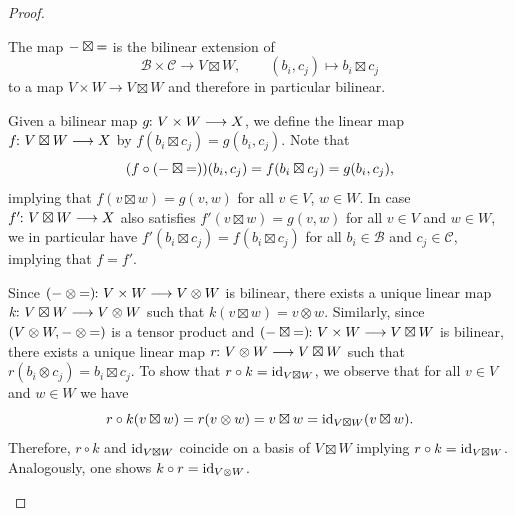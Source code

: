 \documentclass[a4paper, oneside, 12pt]{amsart}
\begin{document}
\begin{proof}
  \begin{thmlist}
    \item The map \( {-} \boxtimes {=} \) is the bilinear extension of
    \begin{equation*}
      \mathcal{B}\times \mathcal{C} \to V\boxtimes W, \qquad (b_{i}, c_{j})\mapsto b_{i}\boxtimes c_{j}
    \end{equation*}
    to a map \(V \times W \to V \boxtimes W\) and therefore in particular bilinear.
    \item Given a bilinear map \( g \from V \times W \to X \), we define the linear map \( f \from V \boxtimes W \to X \) by \( f(b_i \boxtimes c_j) = g(b_i, c_j) \).
    Note that
    \begin{equation*}
      (f\circ( {-} \boxtimes {=})) (b_{i}, c_{j}) =  f(b_{i} \boxtimes c_{j}) = g(b_{i}, c_{j}),
    \end{equation*}
    implying that \(f(v\boxtimes w) = g(v,w)\) for all \(v\in V\), \(w\in W\).
    In case \(f' \from V\boxtimes W \to X \) also satisfies \(f'(v \boxtimes w) = g(v,w)\) for all \(v\in V\) and \(w\in W\), we in particular have \(f'(b_{i}\boxtimes c_{j}) = f(b_{i} \boxtimes c_{j})\) for all \(b_{i}\in \mathcal{B}\) and \(c_{j}\in \mathcal{C}\), implying that \(f = f'\).

    \item Since \( (\blank \otimes \bblank) \from V \times W \to V \otimes W \) is bilinear, there exists a unique linear map \( k \from V \boxtimes W \to V \otimes W \) such that \( k(v \boxtimes w) = v \otimes w\).
    Similarly, since \(( V \otimes W, {-} \otimes {=}) \) is a tensor product and \( (\blank \boxtimes \bblank) \from V\times W \to V\boxtimes W\) is bilinear, there exists a unique linear map \( r \from V \otimes W \to V \boxtimes W \) such that \( r(b_i \otimes c_j) = b_i \boxtimes c_j \).
    To show that \(r\circ k = \mathrm{id}_{V\boxtimes W}\), we observe that for all \(v\in V\) and \(w\in W\) we have
    \begin{equation*}
      r\circ k (v\boxtimes w) = r(v\otimes w) = v \boxtimes w = \mathrm{id}_{V\boxtimes W} (v\boxtimes w).
    \end{equation*}
    Therefore, \(r\circ k\) and \(\mathrm{id}_{V \boxtimes W}\) coincide on a basis of \(V \boxtimes W\) implying \(r\circ k = \mathrm{id}_{V\boxtimes W}\).
    Analogously, one shows \(k \circ r = \mathrm{id}_{V\otimes W}\). \qedhere
  \end{thmlist}
\end{proof}
\end{document}
